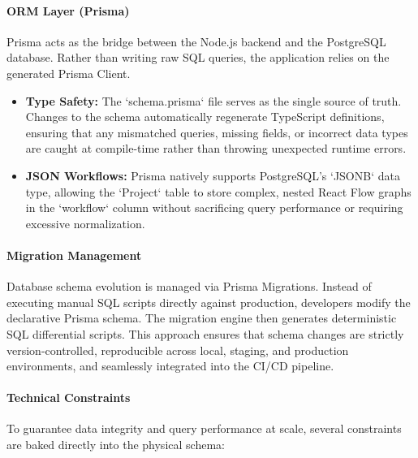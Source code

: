 \paragraph{ORM Layer (Prisma)}
Prisma acts as the bridge between the Node.js backend and the PostgreSQL database. Rather than writing raw SQL queries, the application relies on the generated Prisma Client.
\begin{itemize}
    \item \textbf{Type Safety:} The `schema.prisma` file serves as the single source of truth. Changes to the schema automatically regenerate TypeScript definitions, ensuring that any mismatched queries, missing fields, or incorrect data types are caught at compile-time rather than throwing unexpected runtime errors.
    \item \textbf{JSON Workflows:} Prisma natively supports PostgreSQL's `JSONB` data type, allowing the `Project` table to store complex, nested React Flow graphs in the `workflow` column without sacrificing query performance or requiring excessive normalization.
\end{itemize}

\paragraph{Migration Management}
Database schema evolution is managed via Prisma Migrations. Instead of executing manual SQL scripts directly against production, developers modify the declarative Prisma schema. The migration engine then generates deterministic SQL differential scripts. This approach ensures that schema changes are strictly version-controlled, reproducible across local, staging, and production environments, and seamlessly integrated into the CI/CD pipeline.

\paragraph{Technical Constraints}
To guarantee data integrity and query performance at scale, several constraints are baked directly into the physical schema:

